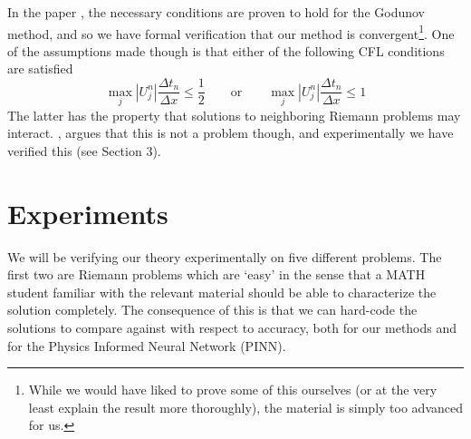\documentclass{myproject}
\begin{document}
In the paper \cite{leveque1985}, the necessary conditions are proven to hold for the Godunov method, and so we have formal verification that our method is convergent\footnote{While we would have liked to prove some of this ourselves (or at the very least explain the result more thoroughly), the material is simply too advanced for us.}. One of the assumptions made though is that either of the following CFL conditions are satisfied
\begin{equation}
    \max_{j} |U_j^n| \frac{\Delta t_n}{\Delta x} \leq \frac{1}{2} \qquad \text{or} \qquad \max_{j} |U_j^n| \frac{\Delta t_n}{\Delta x} \leq 1
\end{equation}
The latter has the property that solutions to neighboring Riemann problems may interact. \Cite{leveque1985}, argues that this is not a problem though, and experimentally we have verified this (see Section 3).

\section{Experiments}

We will be verifying our theory experimentally on five different problems. The first two are Riemann problems which are `easy' in the sense that a MATH student familiar with the relevant material should be able to characterize the solution completely. The consequence of this is that we can hard-code the solutions to compare against with respect to accuracy, both for our methods and for the Physics Informed Neural Network (PINN).
\end{document}
